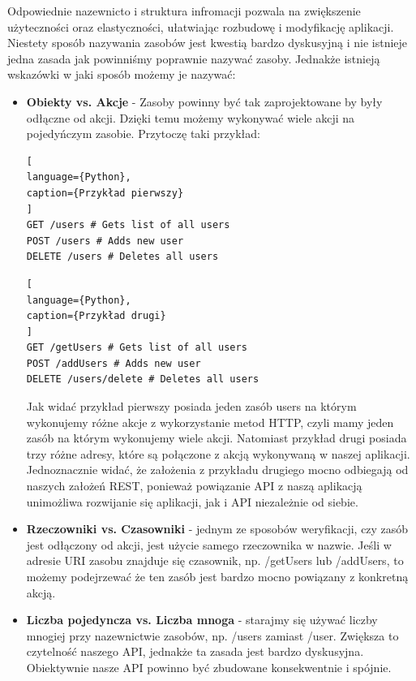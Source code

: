 \documentclass[oneside,polski,logo,indent]{amuthesis}
\begin{document}
Odpowiednie nazewnicto i struktura infromacji pozwala na zwiększenie użyteczności oraz elastyczności, ułatwiając rozbudowę i modyfikację aplikacji. Niestety sposób nazywania zasobów jest kwestią bardzo dyskusyjną i nie istnieje jedna zasada jak powinniśmy poprawnie nazywać zasoby. Jednakże istnieją wskazówki w jaki sposób możemy je nazywać:\newline

\begin{itemize}
\item \textbf{Obiekty vs. Akcje} - Zasoby powinny być tak zaprojektowane by były odłączne od akcji. Dzięki temu możemy wykonywać wiele akcji na pojedyńczym zasobie. Przytoczę taki przykład:\newline
\begin{lstlisting}[
language={Python},
caption={Przykład pierwszy}
]
GET /users # Gets list of all users
POST /users # Adds new user
DELETE /users # Deletes all users
\end{lstlisting}

\begin{lstlisting}[
language={Python},
caption={Przykład drugi}
]
GET /getUsers # Gets list of all users
POST /addUsers # Adds new user
DELETE /users/delete # Deletes all users
\end{lstlisting}

Jak widać przykład pierwszy posiada jeden zasób users na którym wykonujemy różne akcje z wykorzystanie metod HTTP, czyli mamy jeden zasób na którym wykonujemy wiele akcji. Natomiast przykład drugi posiada trzy różne adresy, które są połączone z akcją wykonywaną w naszej aplikacji. Jednoznacznie widać, że założenia z przykładu drugiego mocno odbiegają od naszych założeń REST, ponieważ powiązanie API z naszą aplikacją unimożliwa rozwijanie się aplikacji, jak i API niezależnie od siebie.\newline

\item \textbf{Rzeczowniki vs. Czasowniki} - jednym ze sposobów weryfikacji, czy zasób jest odłączony od akcji, jest użycie samego rzeczownika w nazwie. Jeśli w adresie URI zasobu znajduje się czasownik, np. /getUsers lub /addUsers, to możemy podejrzewać że ten zasób jest bardzo mocno powiązany z konkretną akcją.\newline

\item \textbf{Liczba pojedyncza vs. Liczba mnoga} - starajmy się używać liczby mnogiej przy nazewnictwie zasobów, np. /users zamiast /user. Zwiększa to czytelność naszego API, jednakże ta zasada jest bardzo dyskusyjna. Obiektywnie nasze API powinno być zbudowane konsekwentnie i spójnie. 
\end{itemize}
\end{document}

